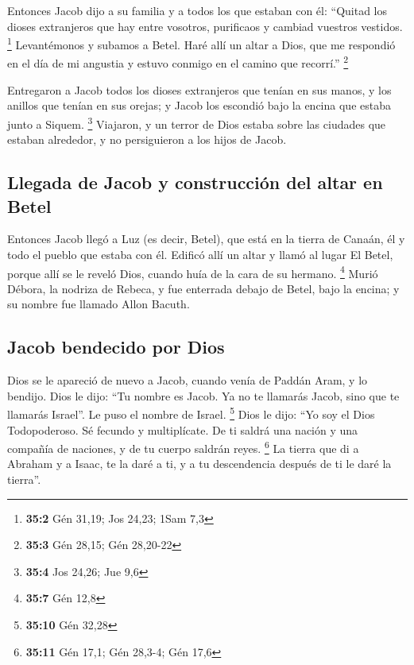 \begin{paracol}{2}
 Entonces Jacob dijo a su familia y a todos los que
estaban con él: ``Quitad los dioses extranjeros que hay entre vosotros,
purificaos y cambiad vuestros vestidos. \footnote{\textbf{35:2} Gén
  31,19; Jos 24,23; 1Sam 7,3}  Levantémonos y subamos a
Betel. Haré allí un altar a Dios, que me respondió en el día de mi
angustia y estuvo conmigo en el camino que recorrí.'' \footnote{\textbf{35:3}
  Gén 28,15; Gén 28,20-22}

 Entregaron a Jacob todos los dioses extranjeros que
tenían en sus manos, y los anillos que tenían en sus orejas; y Jacob los
escondió bajo la encina que estaba junto a Siquem. \footnote{\textbf{35:4}
  Jos 24,26; Jue 9,6}  Viajaron, y un terror de Dios
estaba sobre las ciudades que estaban alrededor, y no persiguieron a los
hijos de Jacob.

\hypertarget{llegada-de-jacob-y-construcciuxf3n-del-altar-en-betel}{%
\subsection{Llegada de Jacob y construcción del altar en
Betel}\label{llegada-de-jacob-y-construcciuxf3n-del-altar-en-betel}}

 Entonces Jacob llegó a Luz (es decir, Betel), que está en
la tierra de Canaán, él y todo el pueblo que estaba con él.
 Edificó allí un altar y llamó al lugar El Betel, porque
allí se le reveló Dios, cuando huía de la cara de su hermano.
\footnote{\textbf{35:7} Gén 12,8}  Murió Débora, la
nodriza de Rebeca, y fue enterrada debajo de Betel, bajo la encina; y su
nombre fue llamado Allon Bacuth.

\hypertarget{jacob-bendecido-por-dios}{%
\subsection{Jacob bendecido por Dios}\label{jacob-bendecido-por-dios}}

 Dios se le apareció de nuevo a Jacob, cuando venía de
Paddán Aram, y lo bendijo.  Dios le dijo: ``Tu nombre es
Jacob. Ya no te llamarás Jacob, sino que te llamarás Israel''. Le puso
el nombre de Israel. \footnote{\textbf{35:10} Gén 32,28} 
Dios le dijo: ``Yo soy el Dios Todopoderoso. Sé fecundo y multiplícate.
De ti saldrá una nación y una compañía de naciones, y de tu cuerpo
saldrán reyes. \footnote{\textbf{35:11} Gén 17,1; Gén 28,3-4; Gén 17,6}
 La tierra que di a Abraham y a Isaac, te la daré a ti, y
a tu descendencia después de ti le daré la tierra''.


\end{paracol}

